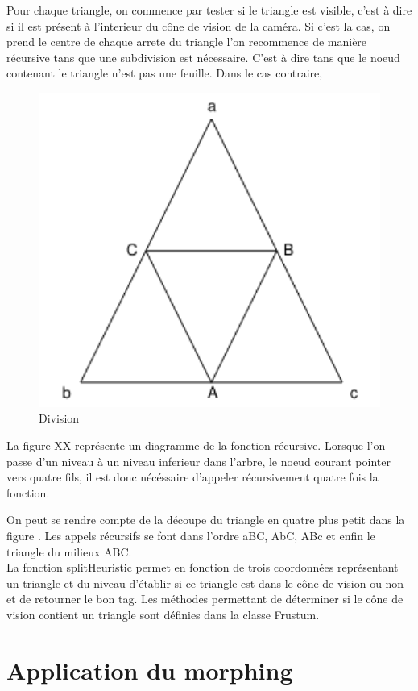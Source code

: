 \documentclass[12pt]{report}
\begin{document}
	Pour chaque triangle, on commence par tester si le triangle est visible, c'est à dire si il est
	présent à l'interieur du cône de vision de la caméra. Si c'est la cas, on prend le centre de chaque
	arrete du triangle l'on recommence de manière récursive tans que une subdivision est nécessaire.
	C'est à dire tans que le noeud contenant le triangle n'est pas une feuille. Dans le cas contraire,
	
	\begin{figure}[!h]
    \includegraphics[width=12cm]{img/TriangleSplit.png}
    \caption{Division}
    \label{fig:TriangleSplit}
	\end{figure}
	
	La figure XX représente un diagramme de la fonction récursive. Lorsque l'on passe d'un niveau à un
	niveau inferieur dans l'arbre, le noeud courant pointer vers quatre fils, il est donc nécéssaire
	d'appeler récursivement quatre fois la fonction.
	
	On peut se rendre compte de la découpe du triangle en quatre plus petit dans la figure 
	\cite{TriangleSplit}.
	Les appels récursifs se font dans l'ordre aBC, AbC, ABc et enfin le triangle du milieux ABC.\\
	
	La fonction splitHeuristic permet en fonction de trois coordonnées représentant un triangle 
	et du niveau d'établir si ce triangle est dans le cône de vision ou non et de retourner le bon tag.
	Les méthodes permettant de déterminer si le cône de vision contient un triangle sont définies dans
	la classe Frustum.
	
  \section{Application du morphing}

  

  
  
  
  
  
\end{document}
